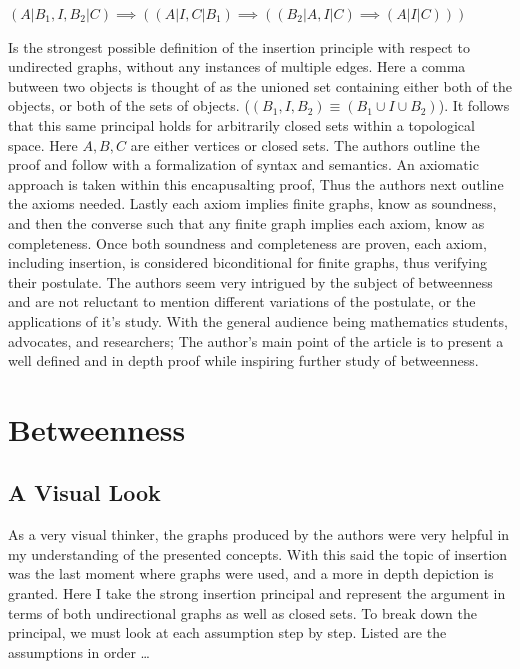 \documentclass[a4paper,man,natbib]{apa6}
\begin{document}
\begin{center}

      $ (A | B_1 , I , B_2 | C) \implies ((A | I , C | B_1) \implies ((B_2 | A , I | C) \implies (A | I | C ))) $

\end{center}

\noindent
Is the strongest possible definition of the insertion principle with respect to undirected graphs, without any instances of multiple edges.
Here a comma butween two objects is thought of as the unioned set containing either both of the objects, or both of the sets of objects. ($ (B_1 , I , B_2) \equiv (B_1 \cup I \cup B_2) $).
It follows that this same principal holds for arbitrarily closed sets within a topological space.
Here $ A , B , C $ are either vertices or closed sets. The authors outline the proof and follow with a formalization of syntax and semantics.
An axiomatic approach is taken within this encapusalting proof, Thus the authors next outline the axioms needed.
Lastly each axiom implies finite graphs, know as soundness, and then the converse such that any finite graph implies each axiom, know as completeness.
Once both soundness and completeness are proven, each axiom, including insertion, is considered biconditional for finite graphs, thus verifying their postulate.
The authors seem very intrigued by the subject of betweenness and are not reluctant to mention different variations of the postulate, or the applications of it's study.
With the general audience being mathematics students, advocates, and researchers;
The author's main point of the article is to present a well defined and in depth proof while inspiring further study of betweenness.


\section{Betweenness}
\label{sec:Graphs and Points}

\subsection{A Visual Look}
As a very visual thinker, the graphs produced by the authors were very helpful in my understanding of the presented concepts.
With this said the topic of insertion was the last moment where graphs were used, and a more in depth depiction is granted.
Here I take the strong insertion principal and represent the argument in terms of both undirectional graphs as well as closed sets.
To break down the principal, we must look at each assumption step by step. Listed are the assumptions in order \dots
\end{document}
